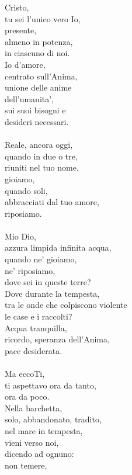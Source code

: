 \begin{haiku}
Cristo,\\
tu sei l’unico vero Io,\\
presente,\\
    almeno in potenza,\\
    in ciascuno di noi.\\
Io d'amore,\\
    centrato sull’Anima,\\
unione delle anime\\
dell’umanita’,\\
sui suoi bisogni e\\
desideri necessari.\\
\leavevmode\\
Reale, ancora oggi,\\
quando in due o tre,\\
riuniti nel tuo nome,\\
gioiamo,\\
quando soli,\\
abbracciati dal tuo amore,\\
riposiamo.\\
\leavevmode\\
Mio Dio,\\
azzura limpida infinita acqua,\\
quando ne' gioiamo,\\
ne' riposiamo,\\
dove sei in queste terre?\\
Dove durante la tempesta,\\
tra le onde che colpiscono violente\\
le case e i raccolti?\\
Acqua tranquilla,\\
ricordo, speranza dell'Anima,\\
pace desiderata.\\
\leavevmode\\
Ma eccoTi,\\
ti aspettavo ora da tanto,\\
ora da poco.\\
Nella barchetta,\\
solo, abbandonato, tradito,\\
nel mare in tempesta,\\
vieni verso noi,\\
dicendo ad ognuno:\\
non temere,\\

\end{haiku}
